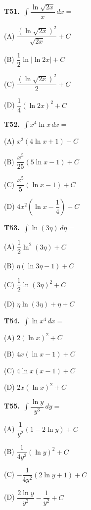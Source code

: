 \documentclass[11pt]{article}
\begin{document}
\bigskip\noindent\textbf{T51.}\ $\displaystyle\int \dfrac{\ln\sqrt{2x}}{x}\,dx =$
\begin{list}{}{\setlength{\leftmargin}{3em}\setlength{\labelwidth}{2.5em}\setlength{\itemsep}{0pt}\setlength{\topsep}{2pt}}
\item[(A)] $\dfrac{(\ln\sqrt{2x})^2}{\sqrt{2x}}+C$
\item[(B)] $\dfrac{1}{2}\ln|\ln 2x|+C$
\item[(C)] $\dfrac{(\ln\sqrt{2x})^2}{2}+C$
\item[(D)] $\dfrac{1}{4}(\ln 2x)^2+C$
\end{list}

\bigskip\noindent\textbf{T52.}\ $\displaystyle\int x^4\ln x\,dx =$
\begin{list}{}{\setlength{\leftmargin}{3em}\setlength{\labelwidth}{2.5em}\setlength{\itemsep}{0pt}\setlength{\topsep}{2pt}}
\item[(A)] $x^2(4\ln x+1)+C$
\item[(B)] $\dfrac{x^5}{25}(5\ln x-1)+C$
\item[(C)] $\dfrac{x^5}{5}(\ln x-1)+C$
\item[(D)] $4x^2\left(\ln x-\dfrac{1}{4}\right)+C$
\end{list}

\bigskip\noindent\textbf{T53.}\ $\displaystyle\int \ln(3\eta)\,d\eta =$
\begin{list}{}{\setlength{\leftmargin}{3em}\setlength{\labelwidth}{2.5em}\setlength{\itemsep}{0pt}\setlength{\topsep}{2pt}}
\item[(A)] $\dfrac{1}{2}\ln^2(3\eta)+C$
\item[(B)] $\eta(\ln 3\eta-1)+C$
\item[(C)] $\dfrac{1}{2}\ln(3\eta)^2+C$
\item[(D)] $\eta\ln(3\eta)+\eta+C$
\end{list}

\bigskip\noindent\textbf{T54.}\ $\displaystyle\int \ln x^4\,dx =$
\begin{list}{}{\setlength{\leftmargin}{3em}\setlength{\labelwidth}{2.5em}\setlength{\itemsep}{0pt}\setlength{\topsep}{2pt}}
\item[(A)] $2(\ln x)^2+C$
\item[(B)] $4x(\ln x-1)+C$
\item[(C)] $4\ln x(x-1)+C$
\item[(D)] $2x(\ln x)^2+C$
\end{list}

\bigskip\noindent\textbf{T55.}\ $\displaystyle\int \dfrac{\ln y}{y^3}\,dy =$
\begin{list}{}{\setlength{\leftmargin}{3em}\setlength{\labelwidth}{2.5em}\setlength{\itemsep}{0pt}\setlength{\topsep}{2pt}}
\item[(A)] $\dfrac{1}{y^2}(1-2\ln y)+C$
\item[(B)] $\dfrac{1}{4y^2}(\ln y)^2+C$
\item[(C)] $-\dfrac{1}{4y^2}(2\ln y+1)+C$
\item[(D)] $\dfrac{2\ln y}{y^2}-\dfrac{1}{y^2}+C$
\end{list}
\end{document}

